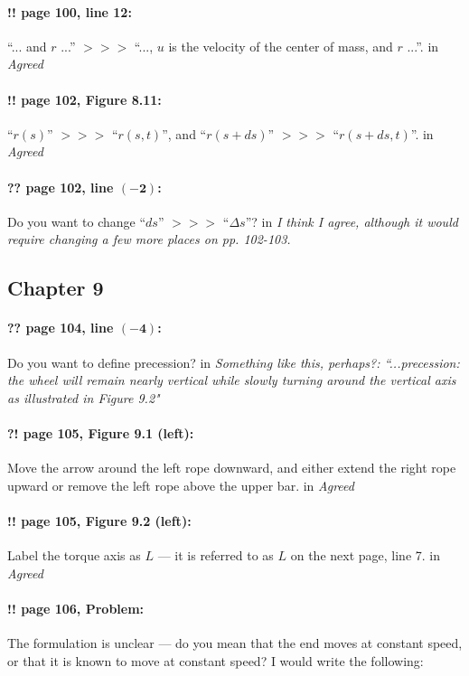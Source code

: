 \documentclass[twoside]{article}
\begin{document}
\paragraph{!! page 100, line 12:} “... and $r$ ...” $>\!>\!>$ “..., $u$ is the velocity of the center of mass, and $r$ ...”.
 in {\it  Agreed} 

\paragraph{!! page 102, Figure 8.11:} “$r(s)$” $>\!>\!>$ “$r(s,t)$”,
and “$r(s+ds)$” $>\!>\!>$ “$r(s+ds,t)$”.
 in {\it  Agreed} 


\paragraph{?? page 102, line $\bm{(-2)}$:} Do you want to change “$ds$” $>\!>\!>$ “$\Delta s$”?
 in {\it I think I agree, although it would require changing a few more places on pp. 102-103.} 

\subsection*{Chapter 9}

\paragraph{?? page 104, line $\bm{(-4)}$:} Do you want to define precession?
 in {\it  Something like this, perhaps?: ``...precession: the wheel will remain nearly vertical while slowly turning around the vertical axis as illustrated in Figure 9.2" } 

\paragraph{?! page 105, Figure 9.1 (left):} Move the arrow around the left rope downward,
and either extend the right rope upward or remove the left rope above the upper bar.
 in {\it  Agreed} 

\paragraph{!! page 105, Figure 9.2 (left):} Label the torque axis as $L$ — it is referred to as $L$ on the next page, line 7.
 in {\it  Agreed} 

\paragraph{!! page 106, Problem:} The formulation is unclear — do you mean that the end moves at constant speed, or that it is known to move at constant speed? I would write the following:
\end{document}
